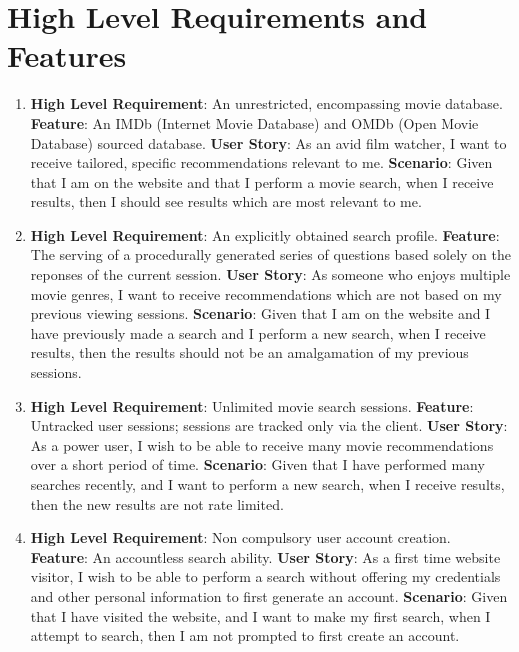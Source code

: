\documentclass{article}
\begin{document}
\section{High Level Requirements and Features}
\begin{enumerate}
\item
\textbf{High Level Requirement}: An unrestricted, encompassing movie database.
\newline
\textbf{Feature}: An IMDb (Internet Movie Database) and OMDb (Open Movie 
Database) sourced database.
\newline
\textbf{User Story}: As an avid film watcher, I want to receive tailored, 
specific recommendations relevant to me.
\newline
\textbf{Scenario}:
Given that I am on the website and that I perform a movie search, when I receive 
results, then I should see results which are most relevant to me.
\newline

\item
\textbf{High Level Requirement}: An explicitly obtained search profile.
\newline
\textbf{Feature}:
The serving of a procedurally generated series of questions based solely on the
reponses of the current session.
\newline
\textbf{User Story}:
As someone who enjoys multiple movie genres, I want to receive recommendations
which are not based on my previous viewing sessions.
\newline
\textbf{Scenario}:
Given that I am on the website and I have previously made a search and I 
perform a new search, when I receive results, then the results should not be
an amalgamation of my previous sessions.
\newline

\item
\textbf{High Level Requirement}: Unlimited movie search sessions.
\newline
\textbf{Feature}:
Untracked user sessions; sessions are tracked only via the client.
\newline
\textbf{User Story}:
As a power user, I wish to be able to receive many movie recommendations over
a short period of time.
\newline
\textbf{Scenario}:
Given that I have performed many searches recently, and I want to perform a new
search, when I receive results, then the new results are not rate limited.
\newline

\item
\textbf{High Level Requirement}: Non compulsory user account creation.
\newline
\textbf{Feature}:
An accountless search ability.
\newline
\textbf{User Story}:
As a first time website visitor, I wish to be able to perform a search without 
offering my credentials and other personal information to first generate an 
account.
\newline
\textbf{Scenario}:
Given that I have visited the website, and I want to make my first search, when
I attempt to search, then I am not prompted to first create an account.
\newline


\end{enumerate}
\end{document}
